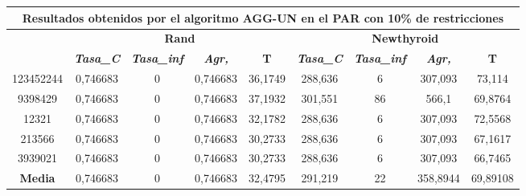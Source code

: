\documentclass[12pt, spanish]{article}
\begin{document}
\begin{table}[H]
\begin{tabular}{|c|c|c|c|c|c|c|c|c|}
\hline
\multicolumn{9}{|c|}{\textbf{Resultados obtenidos por el algoritmo AGG-UN en el PAR con 10\% de restricciones}}                                                                                                   \\ \hline
\multirow{2}{*}{} & \multicolumn{4}{c|}{\textbf{Rand}}                                                            & \multicolumn{4}{c|}{\textbf{Newthyroid}}                                                      \\ \cline{2-9} 
                  & \textit{\textbf{Tasa\_C}} & \textit{\textbf{Tasa\_inf}} & \textit{\textbf{Agr,}} & \textbf{T} & \textit{\textbf{Tasa\_C}} & \textit{\textbf{Tasa\_inf}} & \textit{\textbf{Agr,}} & \textbf{T} \\ \hline
123452244         & 0,746683                  & 0                           & 0,746683               & 36,1749    & 288,636                   & 6                           & 307,093                & 73,114     \\ \hline
9398429           & 0,746683                  & 0                           & 0,746683               & 37,1932    & 301,551                   & 86                          & 566,1                  & 69,8764    \\ \hline
12321             & 0,746683                  & 0                           & 0,746683               & 32,1782    & 288,636                   & 6                           & 307,093                & 72,5568    \\ \hline
213566            & 0,746683                  & 0                           & 0,746683               & 30,2733    & 288,636                   & 6                           & 307,093                & 67,1617    \\ \hline
3939021           & 0,746683                  & 0                           & 0,746683               & 30,2733    & 288,636                   & 6                           & 307,093                & 66,7465    \\ \hline
\textbf{Media}    & 0,746683                  & 0                           & 0,746683               & 32,4795    & 291,219                   & 22                          & 358,8944               & 69,89108   \\ \hline
\end{tabular}
\end{table}
\end{document}
